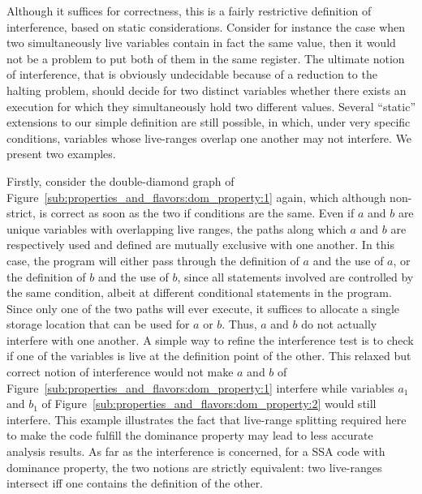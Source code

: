 Although it suffices for correctness, this is a fairly restrictive definition of interference, based on static considerations. 
Consider for instance the case when two simultaneously live variables contain in fact the same value, then it would not be a problem to put both of them in the same register. 
The ultimate notion of interference, that is obviously undecidable because of a reduction to the halting problem, should decide for two distinct variables whether there exists an execution for which they simultaneously hold two different values. 
Several ``static'' extensions to our simple definition are still possible, in which, under very specific conditions, variables whose live-ranges overlap one another may not interfere. 
We present two examples.

Firstly, consider the double-diamond graph of Figure~\ref{sub:properties_and_flavors:dom_property:1} again, which although non-strict, is correct as soon as the two if conditions are the same. 
Even if $a$ and $b$ are unique variables with overlapping live ranges, the paths along which $a$ and $b$ are respectively used and defined are mutually exclusive with one another. 
In this case, the program will either pass through the definition of $a$ and the use of $a$, or the definition of $b$ and the use of $b$, since all statements involved are controlled by the same condition, albeit at different conditional statements in the program. 
Since only one of the two paths will ever execute, it suffices to allocate a single storage location that can be used for $a$ or $b$. 
Thus, $a$ and $b$ do not actually interfere with one another. 
A simple way to refine the interference test is to check if one of the variables is live at the definition point of the other. 
This relaxed but correct notion of interference would not make $a$ and $b$ of Figure~\ref{sub:properties_and_flavors:dom_property:1} interfere while variables $a_1$ and $b_1$ of Figure~\ref{sub:properties_and_flavors:dom_property:2} would still interfere. 
This example illustrates the fact that live-range splitting required here to make the code fulfill the dominance property may lead to less accurate analysis results. 
As far as the interference is concerned, for a SSA code with dominance property, the two notions are strictly equivalent:  two live-ranges intersect iff one contains the definition of the other.

